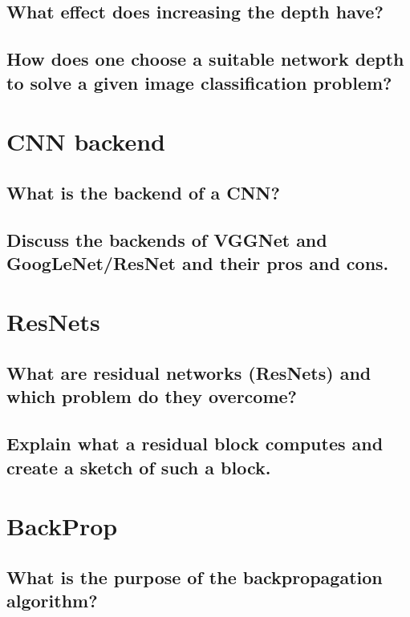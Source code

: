 \subsection{What effect does increasing the depth have?}

\subsection{How does one choose a suitable network depth to solve a given image classification problem?}

\section{CNN backend}

\subsection{What is the backend of a CNN?}

\subsection{Discuss the backends of VGGNet and GoogLeNet/ResNet and their pros and cons.}

\section{ResNets}

\subsection{What are residual networks (ResNets) and which problem do they overcome?}

\subsection{Explain what a residual block computes and create a sketch of such a block.}

\section{BackProp}

\subsection{What is the purpose of the backpropagation algorithm?}

